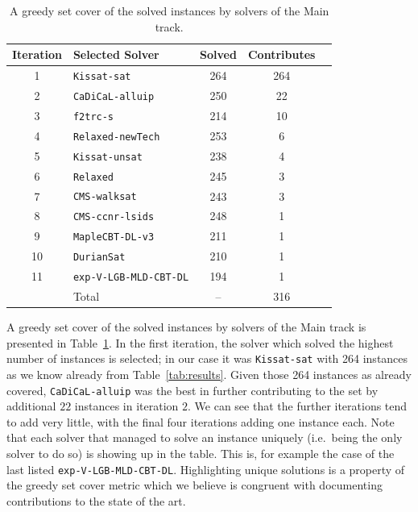 \documentclass{elsarticle}
\newcommand{\solver}[1]{\texttt{#1}}
\begin{document}
\begin{table}
\centering\small
\begin{tabularx}{\linewidth}{cXccc}
\bf Iteration & \bf Selected Solver & \bf Solved & \bf Contributes \\ %
\hline\arrayrulecolor{lightgray}
\phantom{0}1 & \solver{Kissat-sat} & 264 & 264 \\ %
\phantom{0}2 & \solver{CaDiCaL-alluip} & 250 & \phantom{0}22 \\ %
\phantom{0}3 & \solver{f2trc-s} & 214 & \phantom{0}10 \\ %
\phantom{0}4 & \solver{Relaxed-newTech} & 253 & \phantom{00}6 \\ %
\phantom{0}5 & \solver{Kissat-unsat} & 238 & \phantom{00}4 \\ %
\phantom{0}6 & \solver{Relaxed} & 245 & \phantom{00}3 \\ %
\phantom{0}7 & \solver{CMS-walksat} & 243 & \phantom{00}3 \\ %
\phantom{0}8 & \solver{CMS-ccnr-lsids} & 248 & \phantom{00}1 \\ %
\phantom{0}9 & \solver{MapleCBT-DL-v3} & 211 & \phantom{00}1 \\ %
10 & \solver{DurianSat} & 210 & \phantom{00}1 \\ %
11 & \solver{exp-V-LGB-MLD-CBT-DL} & 194 & \phantom{00}1 \\ %
\hline
 & Total & -- & 316 \\
\end{tabularx}
\caption{A greedy set cover of the solved instances by solvers of the Main track.}
\label{tab:gscMain}
\end{table}

A greedy set cover of the solved instances by solvers of the Main track is presented in Table~\ref{tab:gscMain}. 
In the first iteration, the solver which solved the highest number of instances is selected; in our case it was \solver{Kissat-sat} with 264 instances as we know already from Table~\ref{tab:results}.
Given those 264 instances as already covered, \solver{CaDiCaL-alluip} was the best in further contributing to the set by additional $22$ instances in iteration $2$.
We can see that the further iterations tend to add very little,
with the final four iterations adding one instance each. Note that each solver
that managed to solve an instance uniquely (i.e.~being the only solver to do so)
is showing up in the table. This is, for example the case of the last listed  
\solver{exp-V-LGB-MLD-CBT-DL}.
Highlighting unique solutions is a property of the greedy set cover metric
which we believe is congruent with documenting contributions to the state of the art.
\end{document}

